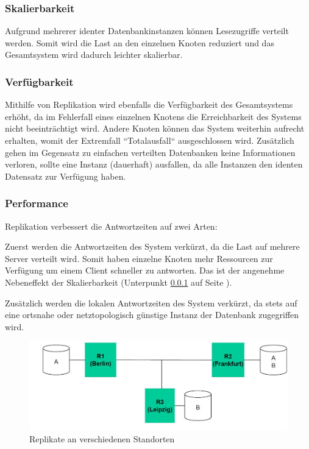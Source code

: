 \subsubsection{Skalierbarkeit}
\label{sec:scale}

Aufgrund mehrerer identer Datenbankinstanzen können Lesezugriffe verteilt werden. Somit wird die Last an den einzelnen Knoten reduziert und das Gesamtsystem wird dadurch leichter skalierbar. \cite{kaiserslautern}

\subsubsection{Verfügbarkeit}

Mithilfe von Replikation wird ebenfalls die Verfügbarkeit des Gesamtsystems erhöht, da im Fehlerfall eines einzelnen Knotens die Erreichbarkeit des Systems nicht beeinträchtigt wird. Andere Knoten können das System weiterhin aufrecht erhalten, womit der Extremfall ``Totalausfall`` ausgeschlossen wird. Zusätzlich gehen im Gegensatz zu einfachen verteilten Datenbanken keine Informationen verloren, sollte eine Instanz (dauerhaft) ausfallen, da alle Instanzen den identen Datensatz zur Verfügung haben. \cite{leipzig}

\subsubsection{Performance}

Replikation verbessert die Antwortzeiten auf zwei Arten:

Zuerst werden die Antwortzeiten des System verkürzt, da die Last auf mehrere Server verteilt wird. Somit haben einzelne Knoten mehr Ressourcen zur Verfügung um einem Client schneller zu antworten. Das ist der angenehme Nebeneffekt der Skalierbarkeit (Unterpunkt \ref{sec:scale} auf Seite \pageref{sec:scale}). \cite{leipzig}

Zusätzlich werden die lokalen Antwortzeiten des System verkürzt, da stets auf eine ortsnahe oder netztopologisch günstige Instanz der Datenbank zugegriffen wird. \cite{leipzig}

\begin{figure}[!h]
	\begin{center}
		\includegraphics[width=1\linewidth]{images/ortsverteilung.jpg}
		\caption{Replikate an verschiedenen Standorten \cite{leipzig2}}
		\label{ortsvert}
	\end{center}
\end{figure}

